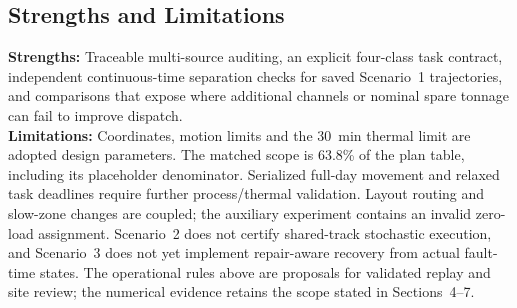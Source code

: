 \documentclass[11pt,a4paper]{article}
\begin{document}
\subsection{Strengths and Limitations}
\textbf{Strengths:} Traceable multi-source auditing, an explicit four-class task contract, independent continuous-time separation checks for saved Scenario~1 trajectories, and comparisons that expose where additional channels or nominal spare tonnage can fail to improve dispatch.\\
\textbf{Limitations:} Coordinates, motion limits and the 30~min thermal limit are adopted design parameters. The matched scope is 63.8\% of the plan table, including its placeholder denominator. Serialized full-day movement and relaxed task deadlines require further process/thermal validation. Layout routing and slow-zone changes are coupled; the auxiliary experiment contains an invalid zero-load assignment. Scenario~2 does not certify shared-track stochastic execution, and Scenario~3 does not yet implement repair-aware recovery from actual fault-time states. The operational rules above are proposals for validated replay and site review; the numerical evidence retains the scope stated in Sections~4--7.

\newpage




\end{document}
